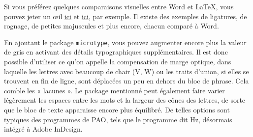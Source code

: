 \documentclass[11pt,a4paper,ngerman,french,DIV=8]{scrartcl}
\begin{document}
Si vous préférez quelques comparaisons visuelles entre Word et \LaTeX{}, vous pouvez jeter un œil \href{http://nitens.org/taraborelli/latex}{ici} et \href{http://www.niederberger.com.de/warum-latex-ein-vergleich-mit-libreoffice}{ici}, par exemple. Il existe des exemples de ligatures, de rognage, de petites majuscules et plus encore, chacun comparé à Word.

En ajoutant le package \texttt{microtype}, vous pouvez augmenter encore plus la valeur de gris en activant des détails typographiques supplémentaires. Il est donc possible d'utiliser ce qu'on appelle la compensation de marge optique, dans laquelle les lettres avec beaucoup de chair (V, W) ou les traits d'union, si elles se trouvent en fin de ligne, sont déplacées un peu en dehors du bloc de phrase. Cela comble les « lacunes ». Le package mentionné peut également faire varier légèrement les espaces entre les mots et la largeur des cônes des lettres, de sorte que le bloc de texte apparaisse encore plus équilibré. De telles options sont typiques des programmes de PAO, tels que le programme dit Hz, désormais intégré à Adobe InDesign.
\end{document}
